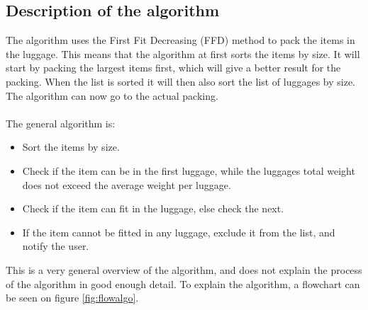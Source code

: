 \subsection{Description of the algorithm}
The algorithm uses the First Fit Decreasing (FFD) method to pack the items in the luggage. This means that the algorithm at first sorts the items by size. It will start by packing the largest items first, which will give a better result for the packing. When the list is sorted it will then also sort the list of luggages by size. The algorithm can now go to the actual packing.\\
\\
The general algorithm is:
\begin{itemize}
	\item Sort the items by size.
	\item Check if the item can be in the first luggage, while the luggages total weight does not exceed the average weight per luggage.
	\item Check if the item can fit in the luggage, else check the next.
	\item If the item cannot be fitted in any luggage, exclude it from the list, and notify the user.
\end{itemize}

This is a very general overview of the algorithm, and does not explain the process of the algorithm in good enough detail. To explain the algorithm, a flowchart can be seen on figure \ref{fig:flowalgo}.


